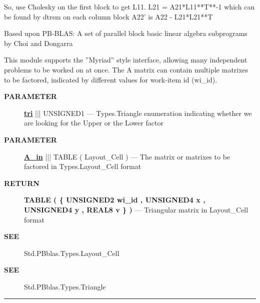  So, use Cholesky on the first block to get L11. L21 = A21*L11**T**-1 which can be found by dtrsm on each column block A22' is A22 - L21*L21**T 
\par
 Based upon PB-BLAS: A set of parallel block basic linear algebra subprograms by Choi and Dongarra 


\par
 This module supports the ''Myriad'' style interface, allowing many independent problems to be worked on at once. The A matrix can contain multiple matrixes to be factored, indicated by different values for work-item id (wi\_id).








\par
\begin{description}
\item [\colorbox{tagtype}{\color{white} \textbf{\textsf{PARAMETER}}}] \textbf{\underline{tri}} ||| UNSIGNED1 --- Types.Triangle enumeration indicating whether we are looking for the Upper or the Lower factor
\item [\colorbox{tagtype}{\color{white} \textbf{\textsf{PARAMETER}}}] \textbf{\underline{A\_in}} ||| TABLE ( Layout\_Cell ) --- The matrix or matrixes to be factored in Types.Layout\_Cell format
\end{description}







\par
\begin{description}
\item [\colorbox{tagtype}{\color{white} \textbf{\textsf{RETURN}}}] \textbf{TABLE ( \{ UNSIGNED2 wi\_id , UNSIGNED4 x , UNSIGNED4 y , REAL8 v \} )} --- Triangular matrix in Layout\_Cell format
\end{description}






\par
\begin{description}
\item [\colorbox{tagtype}{\color{white} \textbf{\textsf{SEE}}}] Std.PBblas.Types.Layout\_Cell
\item [\colorbox{tagtype}{\color{white} \textbf{\textsf{SEE}}}] Std.PBblas.Types.Triangle
\end{description}




\rule{\linewidth}{0.5pt}
